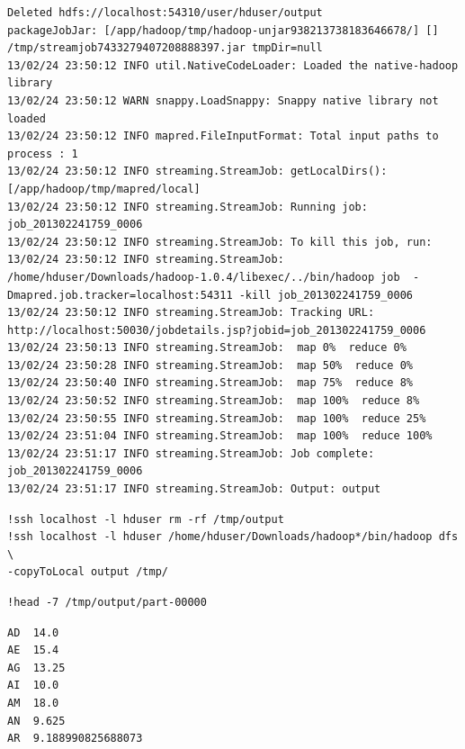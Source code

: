 \documentclass[12pt,fleqn]{article}\usepackage{../common}
\begin{document}
\begin{verbatim}
Deleted hdfs://localhost:54310/user/hduser/output
packageJobJar: [/app/hadoop/tmp/hadoop-unjar938213738183646678/] [] /tmp/streamjob7433279407208888397.jar tmpDir=null
13/02/24 23:50:12 INFO util.NativeCodeLoader: Loaded the native-hadoop library
13/02/24 23:50:12 WARN snappy.LoadSnappy: Snappy native library not loaded
13/02/24 23:50:12 INFO mapred.FileInputFormat: Total input paths to process : 1
13/02/24 23:50:12 INFO streaming.StreamJob: getLocalDirs(): [/app/hadoop/tmp/mapred/local]
13/02/24 23:50:12 INFO streaming.StreamJob: Running job: job_201302241759_0006
13/02/24 23:50:12 INFO streaming.StreamJob: To kill this job, run:
13/02/24 23:50:12 INFO streaming.StreamJob: /home/hduser/Downloads/hadoop-1.0.4/libexec/../bin/hadoop job  -Dmapred.job.tracker=localhost:54311 -kill job_201302241759_0006
13/02/24 23:50:12 INFO streaming.StreamJob: Tracking URL: http://localhost:50030/jobdetails.jsp?jobid=job_201302241759_0006
13/02/24 23:50:13 INFO streaming.StreamJob:  map 0%  reduce 0%
13/02/24 23:50:28 INFO streaming.StreamJob:  map 50%  reduce 0%
13/02/24 23:50:40 INFO streaming.StreamJob:  map 75%  reduce 8%
13/02/24 23:50:52 INFO streaming.StreamJob:  map 100%  reduce 8%
13/02/24 23:50:55 INFO streaming.StreamJob:  map 100%  reduce 25%
13/02/24 23:51:04 INFO streaming.StreamJob:  map 100%  reduce 100%
13/02/24 23:51:17 INFO streaming.StreamJob: Job complete: job_201302241759_0006
13/02/24 23:51:17 INFO streaming.StreamJob: Output: output
\end{verbatim}

\begin{verbatim}
!ssh localhost -l hduser rm -rf /tmp/output
!ssh localhost -l hduser /home/hduser/Downloads/hadoop*/bin/hadoop dfs  \
-copyToLocal output /tmp/
\end{verbatim}

\begin{verbatim}
!head -7 /tmp/output/part-00000
\end{verbatim}

\begin{verbatim}
AD	14.0
AE	15.4
AG	13.25
AI	10.0
AM	18.0
AN	9.625
AR	9.188990825688073
\end{verbatim}
\end{document}
